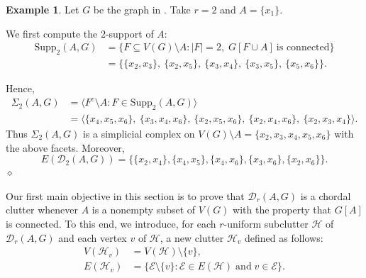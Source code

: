 \documentclass[12pt,reqno]{amsart}
\theoremstyle{definition}
\newtheorem{example}[proposition]{Example}
\def\H{\mathcal{H}}
\def\E{\mathcal{E}}
\def\D{\mathcal{D}}
\begin{document}
\begin{example}\label{example 1}
Let $G$ be the graph in . Take $r=2$ and $A=\{x_1\}$.


\begin{figure}[H]
		\centering
		\caption{}\label{fig:chordal graph}
	\end{figure}    
We first compute the $2$-support of $A$:
\begin{align*}
\mathrm{Supp}_2(A,G) & = \{ F \subseteq V(G)\setminus A : |F|=2,\; G[F \cup A]\ \text{is connected} \} \\ 
& = \{\{x_2,x_3\},\ \{x_2,x_5\},\ \{x_3,x_4\},\ \{x_3,x_5\},\ \{x_5,x_6\}\} .
\end{align*}

\noindent
Hence,
\begin{align*}
\Sigma_2(A,G)
& = \langle F^c \setminus A : F \in \mathrm{Supp}_2(A,G) \rangle\\
& = \langle \{x_4,x_5,x_6\},\ \{x_3,x_4,x_6\},\ \{x_2,x_5,x_6\},\ \{x_2,x_4,x_6\},\ \{x_2,x_3,x_4\} \rangle .
\end{align*}
Thus $\Sigma_2(A,G)$ is a simplicial complex on $V(G)\setminus A = \{x_2,x_3,x_4,x_5,x_6\}$ with the above facets. Moreover, 
\[
E(\D_2(A,G))=\{\{x_2,x_4\},\{x_4,x_5\}, \{x_4,x_6\},\{x_3,x_6\},\{x_2,x_6\}\}.
\]
\hfill$\diamond$
\end{example}

\medskip
\medskip
Our first main objective in this section is to prove that $\D_r(A,G)$ is a chordal clutter whenever $A$ is a nonempty subset of $V(G)$ with the property that $G[A]$ is connected. To this end, we introduce, for each $r$-uniform subclutter $\H$ of $\D_r(A,G)$ and each vertex $v$ of $\H$, a new clutter $\H_v$ defined as follows:
\begin{align*}
  V(\H_v) &= V(\H) \setminus \{v\},\\
  E(\H_v) &= \{\E \setminus \{v\} :\E \in E(\H) \; \text{and} \; v \in \E\}.
\end{align*}
\end{document}

